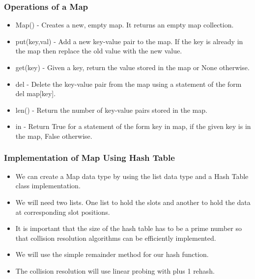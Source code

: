 \documentclass{beamer}
\begin{document}
\begin{frame}
\frametitle{Operations of a Map}
\begin{itemize}
\item Map() - Creates a new, empty map. It returns an empty map collection.
\item put(key,val) - Add a new key-value pair to the map. If the key is already in the map
then replace the old value with the new value.
\item get(key) - Given a key, return the value stored in the map or None otherwise.
\item del - Delete the key-value pair from the map using a statement of the form del map[key].
\item len() - Return the number of key-value pairs stored in the map.
\item in - Return True for a statement of the form key in map, if the given key is in the map, False otherwise.
\end{itemize}
\end{frame}

\begin{frame}
\frametitle{Implementation of Map Using Hash Table}
\begin{itemize}
\item We can create a Map data type by using the list data type and a Hash Table class implementation. 
\item We will need two lists. One list to hold the slots and another to hold the data at corresponding slot positions. 
\item It is important that the size of the hash table has to be a prime number so that collision resolution algorithms can be efficiently implemented.
\item We will use the simple remainder method for our hash function.
\item The collision resolution will use linear probing with plus 1 rehash.
\end{itemize}
\end{frame}
\end{document}
